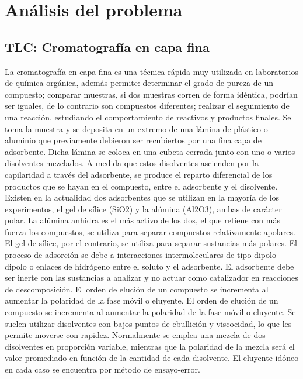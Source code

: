 \chapter{An\'alisis del problema}

\section{TLC: Cromatograf\'ia en capa fina}
La cromatograf\'ia en capa fina es una t\'ecnica r\'apida muy utilizada en laboratorios de qu\'imica org\'anica, adem\'as permite: determinar el grado de pureza de un compuesto; comparar muestras, si dos muestras corren de forma id\'entica, podr\'ian ser iguales, de lo contrario son compuestos diferentes; realizar el seguimiento de una reacci\'on, estudiando el comportamiento de reactivos y productos finales.
Se toma la muestra y se deposita en un extremo de una l\'amina de pl\'astico o aluminio que previamente debieron ser recubiertos por una fina capa de adsorbente. Dicha l\'amina se coloca en una cubeta cerrada junto con uno o varios disolventes mezclados. A medida que estos disolventes ascienden por la capilaridad a trav\'es del adsorbente, se produce el reparto diferencial de los productos que se hayan en el compuesto, entre el adsorbente y el disolvente.
Existen en la actualidad dos adsorbentes que se utilizan en la mayor\'ia de los experimentos, el gel de s\'ilice (SiO2) y la al\'umina (Al2O3), ambas de car\'acter polar. La al\'umina anhidra es el m\'as activo de los dos, el que retiene con m\'as fuerza los compuestos, se utiliza para separar compuestos relativamente apolares. El gel de s\'ilice, por el contrario, se utiliza para separar sustancias m\'as polares. El proceso de adsorci\'on se debe a interacciones intermoleculares de tipo dipolo-dipolo o enlaces de hidr\'ogeno entre el soluto y el adsorbente. El adsorbente debe ser inerte con las sustancias a analizar y no actuar como catalizador en reacciones de descomposici\'on. El orden de eluci\'on de un compuesto se incrementa al aumentar la polaridad de la fase m\'ovil o eluyente. El orden de eluci\'on de un compuesto se incrementa al aumentar la polaridad de la fase m\'ovil o eluyente. Se suelen utilizar disolventes con bajos puntos de ebullici\'on y viscocidad, lo que les permite moverse con rapidez. Normalmente se emplea una mezcla de dos disolventes en proporci\'on variable, mientras que la polaridad de la mezcla ser\'a el valor promediado en funci\'on de la cantidad de cada disolvente. El eluyente id\'oneo en cada caso se encuentra por m\'etodo de ensayo-error.
